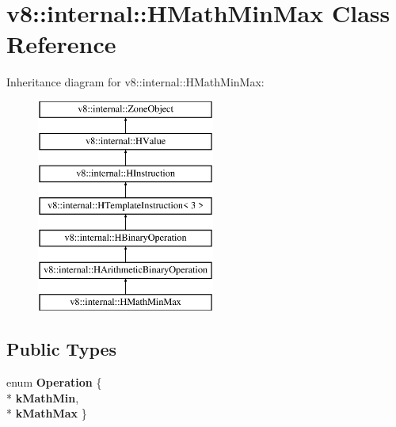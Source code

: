 \hypertarget{classv8_1_1internal_1_1_h_math_min_max}{}\section{v8\+:\+:internal\+:\+:H\+Math\+Min\+Max Class Reference}
\label{classv8_1_1internal_1_1_h_math_min_max}
Inheritance diagram for v8\+:\+:internal\+:\+:H\+Math\+Min\+Max\+:\begin{figure}[H]
\begin{center}
\leavevmode
\includegraphics[height=7.000000cm]{classv8_1_1internal_1_1_h_math_min_max}
\end{center}
\end{figure}
\subsection*{Public Types}
\begin{DoxyCompactItemize}
\item 
enum {\bfseries Operation} \{ \\*
{\bfseries k\+Math\+Min}, 
\\*
{\bfseries k\+Math\+Max}
 \}\hypertarget{classv8_1_1internal_1_1_h_math_min_max_aa89ccefaa3806c7dd9b9f2410c74253d}{}\label{classv8_1_1internal_1_1_h_math_min_max_aa89ccefaa3806c7dd9b9f2410c74253d}

\end{DoxyCompactItemize}
